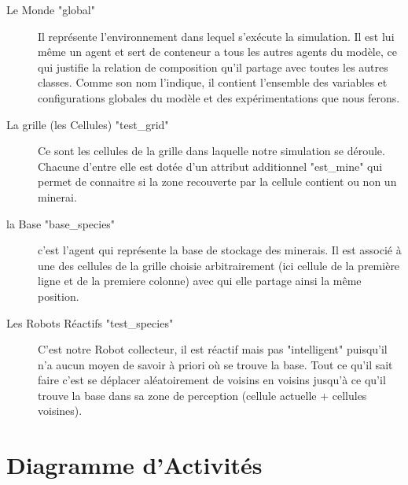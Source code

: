 \begin{description}
	\item[Le Monde "global"] Il représente l'environnement dans lequel s'exécute la simulation. Il est lui même un agent et sert de conteneur a tous les autres agents du modèle, ce qui justifie la relation de composition qu'il partage avec toutes les autres classes. Comme son nom l'indique, il contient l'ensemble des variables et configurations globales du modèle et des expérimentations que nous ferons. 
	
	\item[La grille (les Cellules) "test\_grid"] Ce sont les cellules de la grille dans laquelle notre simulation se déroule. Chacune d'entre elle est dotée d'un attribut additionnel "est\_mine" qui permet de connaitre si la zone recouverte par la cellule contient ou non un minerai.
	
	\item[la Base "base\_species"] c'est l'agent qui représente la base de stockage des minerais. Il est associé à une des cellules de la grille choisie arbitrairement (ici cellule de la première ligne et de la premiere colonne) avec qui elle partage ainsi la même position. 
	
	\item[Les Robots Réactifs "test\_species"] C'est notre Robot collecteur, il est réactif mais pas "intelligent" puisqu'il n'a aucun moyen de savoir à priori où se trouve la base. Tout ce qu'il sait faire c'est se déplacer aléatoirement de voisins en voisins jusqu'à ce qu'il trouve la base dans sa zone de perception (cellule actuelle + cellules voisines).
\end{description}

\section{Diagramme d'Activités}

